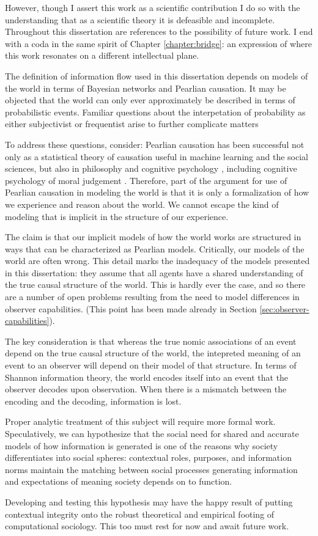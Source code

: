 \documentclass[../thesis.tex]{subfiles}
\begin{document}
 However, though I assert this work as a scientific contribution
 I do so with the understanding that as a scientific theory
 it is defeasible and incomplete.
 Throughout this dissertation are references to the possibility
 of future work.
 I end with a coda in the same spirit of Chapter \ref{chapter:bridge}:
 an expression of where this work resonates on a different intellectual plane.

 The definition of information flow used in this dissertation depends on models of the world in terms of Bayesian networks and
 Pearlian causation.
 It may be objected that the world can only ever approximately be
 described in terms of probabilistic events.
 Familiar questions about the interpetation of probability
 as either subjectivist or frequentist arise to further complicate
 matters

 To address these questions, consider:
 Pearlian causation has been successful not only as a statistical
 theory of causation useful in machine learning and the social
 sciences, but also in philosophy \citep{woodward2005making} and
 cognitive psychology \citep{sloman2005causal}, including
 cognitive psychology of moral judgement \citep{sloman2009causal}.
 Therefore, part of the argument for use of Pearlian causation
 in modeling the world is that it is only a formalization of
 how we experience and reason about the world.
 We cannot escape the kind of modeling that is implicit in the
 structure of our experience.

 The claim is that our implicit models of how the world works
 are structured in ways that can be characterized as Pearlian models.
 Critically, our models of the world are often wrong.
 This detail marks the inadequacy of the models presented
 in this dissertation: they assume that all agents have
 a shared understanding of the true causal structure of
 the world.
 This is hardly ever the case, and so there are a number of
 open problems resulting from the need to model
 differences in observer capabilities. (This point
 has been made already in Section \ref{sec:observer-capabilities}).

 The key consideration is that whereas the true nomic associations
 of an event depend on the true causal structure of the world,
 the intepreted meaning of an event to an observer will depend
 on their model of that structure.
 In terms of Shannon information theory, the world encodes
 itself into an event that the observer decodes upon observation.
 When there is a mismatch between the encoding and the decoding,
 information is lost.

 Proper analytic treatment of this subject will require more
 formal work.
 Speculatively, we can hypothesize that the social need for
 shared and accurate models of how information is generated
 is one of the reasons why society differentiates into
 social spheres:
 contextual roles, purposes, and information norms maintain
 the matching between social processes generating information
 and expectations of meaning society depends on to function.

 Developing and testing this hypothesis may have the happy
 result of putting contextual integrity onto the robust
 theoretical and empirical footing of computational sociology.
 This too must rest for now and await future work.
\end{document}
